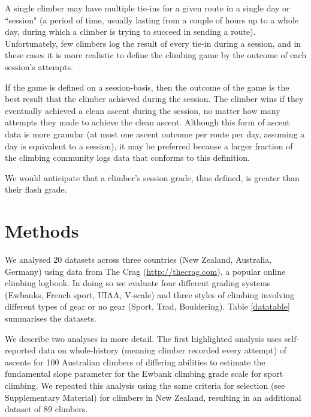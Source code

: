 \documentclass[ba]{imsart}
\begin{document}
A single climber may have multiple tie-ins for a given route in a single day or ``session" (a period of time, usually lasting from a couple of hours up to a whole day, during which a climber is trying to succeed in sending a route).  Unfortunately, few climbers log the result of every tie-in during a session, and in these cases it is more realistic to define the climbing game by the outcome of each session's attempts.

If the game is defined on a session-basis, then the outcome of the game is the best result that the climber achieved during the session. The climber wins if they eventually achieved a clean ascent during the session, no matter how many attempts they made to achieve the clean ascent. Although this form of ascent data is more granular (at most one ascent outcome per route per day, assuming a day is equivalent to a session), it may be preferred because a larger fraction of the climbing community logs data that conforms to this definition.

We would anticipate that a climber's session grade, thus defined, is greater than their flash grade.

\section{Methods}

We analysed 20 datasets across three countries (New Zealand, Australia, Germany) using data from The Crag (\url{http://thecrag.com}), a popular online climbing logbook. In doing so we evaluate four different grading systems (Ewbanks, French sport, UIAA, V-scale) and three styles of climbing involving different types of gear or no gear (Sport, Trad, Bouldering). Table \ref{datatable} summarises the datasets.


\afterpage{%
    \clearpage%
    \thispagestyle{empty}%
    \begin{landscape}%
       
    \end{landscape}
    \clearpage%
}


We describe two analyses in more detail. The first highlighted analysis uses self-reported data on whole-history (meaning climber recorded every attempt) of ascents for 100 Australian climbers of differing abilities to estimate the fundamental slope parameter for the Ewbank climbing grade scale for sport climbing. We repeated this analysis using the same criteria for selection (see Supplementary Material) for climbers in New Zealand, resulting in an additional dataset of 89 climbers.
\end{document}
